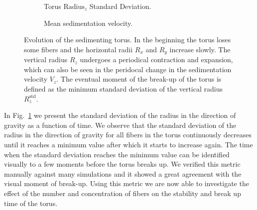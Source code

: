 \begin{figure}[!htbp]
\begin{subfigure}[h]{.48\textwidth}
    \caption{Torus $\text{Radius}_z$ Standard Deviation.}\label{fig:torus_deviation}
  \end{subfigure}
  \begin{subfigure}[h]{.48\textwidth}
    \caption{Mean sedimentation velocity.}\label{fig:torus_velocity}
  \end{subfigure}
  \caption[Evolution of the sedimenting torus.]{Evolution of the sedimenting torus. In the beginning the torus loses some fibers and the horizontal radii $R_x$ and $R_y$ increase slowly. The vertical radius $R_z$ undergoes a periodical contraction and expansion, which can also be seen in the peridocal change in the sedimentation velocity $V_z$. The eventual moment of the break-up of the torus is defined as the minimum standard deviation of the vertical radius $R_z^{\text{std}}$.}
  \label{fig:torus}
\end{figure}

In Fig.~\ref{fig:torus_deviation} we present the standard deviation of the radius in the direction of gravity as a function of time. We observe that the standard deviation of the radius in the direction of gravity for all fibers in the torus continuously decreases until it reaches a minimum value after which it starts to increase again. The time when the standard deviation reaches the minimum value can be identified visually to a few moments before the torus breaks up. We verified this metric manually against many simulations and it showed a great agreement with the visual moment of break-up. Using this metric we are now able to investigate the effect of the number and concentration of fibers on the stability and break up time of the torus.


